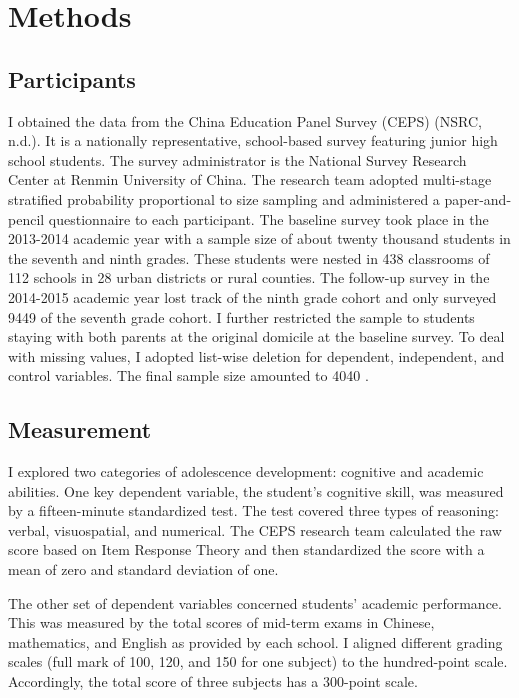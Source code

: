 \documentclass[
  man,floatsintext]{apa7}
\begin{document}
\newpage

\hypertarget{methods}{%
\section{Methods}\label{methods}}

\hypertarget{participants}{%
\subsection{Participants}\label{participants}}

I obtained the data from the China Education Panel Survey (CEPS) (NSRC, n.d.). It is a nationally representative, school-based survey featuring junior high school students. The survey administrator is the National Survey Research Center at Renmin University of China. The research team adopted multi-stage stratified probability proportional to size sampling and administered a paper-and-pencil questionnaire to each participant. The baseline survey took place in the 2013-2014 academic year with a sample size of about twenty thousand students in the seventh and ninth grades. These students were nested in 438 classrooms of 112 schools in 28 urban districts or rural counties. The follow-up survey in the 2014-2015 academic year lost track of the ninth grade cohort and only surveyed 9449 of the seventh grade cohort. I further restricted the sample to students staying with both parents at the original domicile at the baseline survey. To deal with missing values, I adopted list-wise deletion for dependent, independent, and control variables. The final sample size amounted to 4040 .

\hypertarget{measurement}{%
\subsection{Measurement}\label{measurement}}

I explored two categories of adolescence development: cognitive and academic abilities. One key dependent variable, the student's cognitive skill, was measured by a fifteen-minute standardized test. The test covered three types of reasoning: verbal, visuospatial, and numerical. The CEPS research team calculated the raw score based on Item Response Theory and then standardized the score with a mean of zero and standard deviation of one.

The other set of dependent variables concerned students' academic performance. This was measured by the total scores of mid-term exams in Chinese, mathematics, and English as provided by each school. I aligned different grading scales (full mark of 100, 120, and 150 for one subject) to the hundred-point scale. Accordingly, the total score of three subjects has a 300-point scale.
\end{document}
